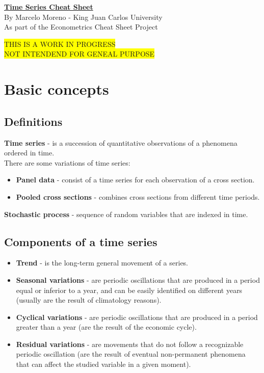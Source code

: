 \documentclass[10pt, a4paper, landscape]{extarticle}
\begin{document}
\setlength{\footskip}{12pt}

\begin{multicols}{3} %

\begin{center}
	\textbf{\LARGE \href{https://github.com/marcelomijas/econometrics-cheatsheet}{Time Series Cheat Sheet}}
	\\ {\footnotesize By Marcelo Moreno - King Juan Carlos University} 
	\\ {\footnotesize As part of the Econometrics Cheat Sheet Project}
\end{center}

\colorbox{yellow}{THIS IS A WORK IN PROGRESS}
\\ \colorbox{yellow}{NOT INTENDEND FOR GENEAL PURPOSE}

\section*{Basic concepts}
	\subsection*{Definitions}
		\textbf{Time series} - is a succession of quantitative observations of a phenomena ordered in time.
		\\ There are some variations of time series:
		\begin{itemize}[leftmargin=*]
			\item \textbf{Panel data} - consist of a time series for each observation of a cross section.
			\item \textbf{Pooled cross sections} - combines cross sections from different time periods.
		\end{itemize}
		\textbf{Stochastic process} - sequence of random variables that are indexed in time.
	\subsection*{Components of a time series}
		\begin{itemize}[leftmargin=*]
			\item \textbf{Trend} - is the long-term general movement of a series.
			\item \textbf{Seasonal variations} - are periodic oscillations that are produced in a period equal or inferior to a year, and can be easily identified on different years (usually are the result of climatology reasons).
			\item \textbf{Cyclical variations} - are periodic oscillations that are produced in a period greater than a year (are the result of the economic cycle).
			\item \textbf{Residual variations} - are movements that do not follow a recognizable periodic oscillation (are the result of eventual non-permanent phenomena that can affect the studied variable in a given moment).
		\end{itemize}


\end{multicols}
\end{document}
